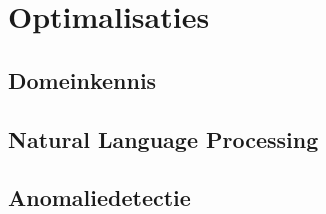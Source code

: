 
\chapter{Optimalisaties}
\label{ch:optimalisaties}


\section{Domeinkennis}
\label{sec:domeinkennis}



\section{Natural Language Processing}
\label{sec:natural-language-processing}



\section{Anomaliedetectie}
\label{sec:anomaliedetectie}

